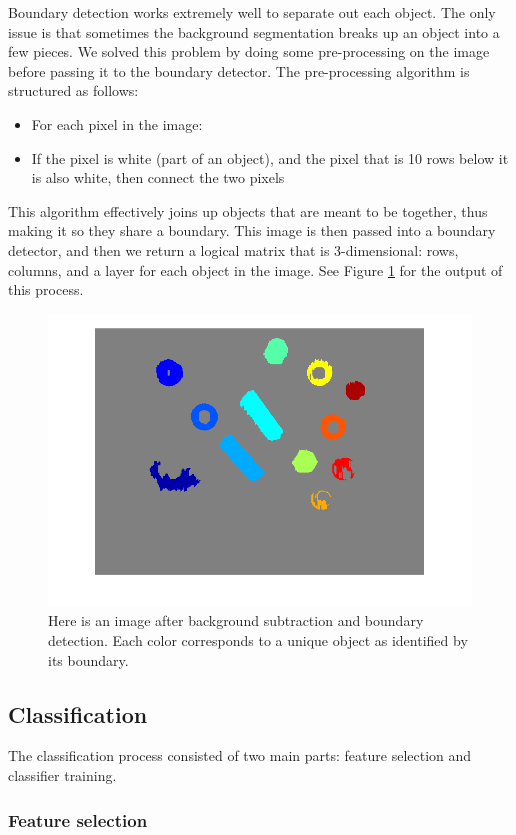 \documentclass[12pt]{article}
\begin{document}
Boundary detection works extremely well to separate out each object. The only issue is that sometimes the background segmentation breaks up an object into a few pieces. We solved this problem by doing some pre-processing on the image before passing it to the boundary detector. The pre-processing algorithm is structured as follows:
\begin{itemize}
	\item For each pixel in the image:
	\item If the pixel is white (part of an object), and the pixel that is 10 rows below it is also white, then connect the two pixels
\end{itemize}
This algorithm effectively joins up objects that are meant to be together, thus making it so they share a boundary. This image is then passed into a boundary detector, and then we return a logical matrix that is 3-dimensional: rows, columns, and a layer for each object in the image. See Figure \ref{fig:bound} for the output of this process.

\begin{figure}
	\centering
	\includegraphics[width=0.8\linewidth]{boundary}
	\caption{Here is an image after background subtraction and boundary detection. Each color corresponds to a unique object as identified by its boundary.}
	\label{fig:bound}
\end{figure}

\subsection{Classification}

The classification process consisted of two main parts: feature selection and classifier training.

\subsubsection{Feature selection}
\end{document}
